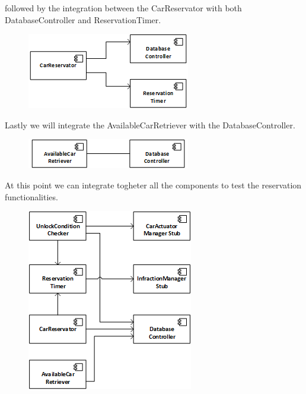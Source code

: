 \documentclass{article}
\begin{document}
followed by the integration between the CarReservator with both DatabaseController and ReservationTimer.
\\
\begin{figure}[H]
\includegraphics[scale=1]{Images/Reservation/ReservatorIntegration.png}
\centering
\end{figure} 

Lastly we will integrate the AvailableCarRetriever with the DatabaseController. 
\begin{figure}[H]
\includegraphics[scale=1]{Images/Reservation/AvailableIntegration.png}
\centering
\end{figure}

At this point we can integrate togheter all the components to test the reservation functionalities.
\begin{figure}[H]
\includegraphics[scale=1]{Images/Reservation/ReservationControllerStrategy.png}
\centering
\end{figure}
\end{document}
